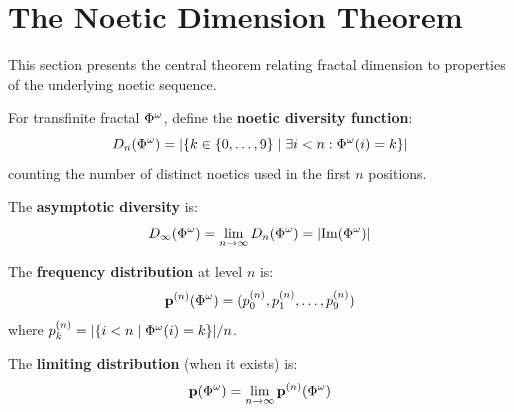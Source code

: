 \section{The Noetic Dimension Theorem}
\label{sec:noetic-dimension-theorem}

\begin{tcolorbox}[colback=green!5!white,colframe=green!75!black,title=\textbf{Main Result}]
This section presents the central theorem relating fractal dimension to properties of the underlying noetic sequence.
\end{tcolorbox}

\begin{definition}
\label{def:noetic-diversity}
For transfinite fractal $\Phi^{\omega}$, define the \textbf{noetic diversity function}:
\[
D_n(\Phi^{\omega}) = |\{k \in \{0, \ldots, 9\} \mid \exists i < n : \Phi^{\omega}(i) = k\}|
\]
counting the number of distinct noetics used in the first $n$ positions.

The \textbf{asymptotic diversity} is:
\[
D_\infty(\Phi^{\omega}) = \lim_{n \to \infty} D_n(\Phi^{\omega}) = |\mathrm{Im}(\Phi^{\omega})|
\]
\end{definition}

\begin{definition}
\label{def:noetic-frequency}
The \textbf{frequency distribution} at level $n$ is:
\[
\mathbf{p}^{(n)}(\Phi^{\omega}) = (p_0^{(n)}, p_1^{(n)}, \ldots, p_9^{(n)})
\]
where $p_k^{(n)} = |\{i < n \mid \Phi^{\omega}(i) = k\}| / n$.

The \textbf{limiting distribution} (when it exists) is:
\[
\mathbf{p}(\Phi^{\omega}) = \lim_{n \to \infty} \mathbf{p}^{(n)}(\Phi^{\omega})
\]
\end{definition}

